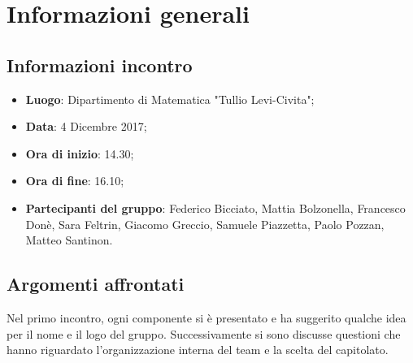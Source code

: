 \section{Informazioni generali}

\subsection{Informazioni incontro}
\begin{itemize}
\item \textbf{Luogo}: Dipartimento di Matematica "Tullio Levi-Civita";
\item \textbf{Data}: 4 Dicembre 2017;
\item \textbf{Ora di inizio}: 14.30;
\item \textbf{Ora di fine}: 16.10;
\item \textbf{Partecipanti del gruppo}: Federico Bicciato, Mattia Bolzonella, 
Francesco Donè, Sara Feltrin, Giacomo Greccio, Samuele Piazzetta, Paolo Pozzan, 
Matteo Santinon. 
\end{itemize}

\subsection{Argomenti affrontati}
Nel primo incontro, ogni componente si è presentato e ha suggerito qualche idea 
per il nome e il logo del gruppo. Successivamente si sono discusse questioni 
che hanno riguardato l'organizzazione interna del team e la scelta del capitolato.

